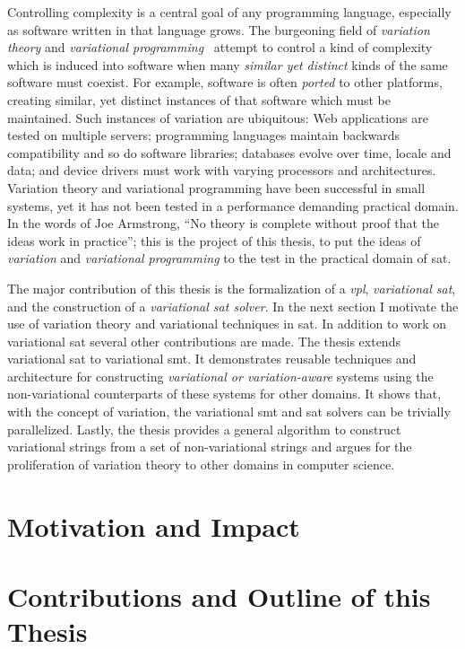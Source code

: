\label{chapter:introduction}%
%
Controlling complexity is a central goal of any programming language, especially
as software written in that language grows. The burgeoning field of
\emph{variation theory} and \emph{variational
  programming}~\cite{EW11gttse,EW11tosem,HW16fosd,CEW16ecoop,Walk14onward}
attempt to control a kind of complexity which is induced into software when many
\emph{similar yet distinct} kinds of the same software must coexist. For
example, software is often \emph{ported} to other platforms, creating similar,
yet distinct instances of that software which must be maintained. Such instances
of variation are ubiquitous: Web applications are tested on multiple servers;
programming languages maintain backwards compatibility and so do software
libraries; databases evolve over time, locale and data; and device drivers must
work with varying processors and architectures. Variation theory and variational
programming have been successful in small systems, yet it has not been tested in a performance demanding
practical domain. In the words of Joe Armstrong\cite{armstrongThesis}, ``No
theory is complete without proof that the ideas work in practice''; this is the
project of this thesis, to put the ideas of \emph{variation} and
\emph{variational programming} to the test in the practical domain of \ac{sat}.

The major contribution of this thesis is the formalization of a \emph{\ac{vpl}},
\emph{variational \acl{sat}}, and the construction of a \emph{variational
  \ac{sat} solver}. In the next section I motivate the use of variation theory
and variational techniques in \acl{sat}. In addition to work on variational
\ac{sat} several other contributions are made. The thesis extends variational
\acl{sat} to variational \ac{smt}. It demonstrates reusable techniques and
architecture for constructing \emph{variational or variation-aware} systems
using the non-variational counterparts of these systems for other domains. It
shows that, with the concept of variation, the variational \ac{smt} and \ac{sat}
solvers can be trivially parallelized. Lastly, the thesis provides a general
algorithm to construct variational strings from a set of non-variational strings
and argues for the proliferation of variation theory to other domains in
computer science.

\section{Motivation and Impact}


\section{Contributions and Outline of this Thesis}


